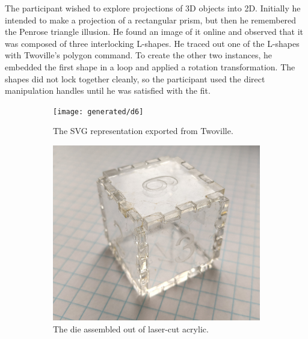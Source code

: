 The participant wished to explore projections of 3D objects into 2D. Initially he intended to make a projection of a rectangular prism, but then he remembered the Penrose triangle illusion. He found an image of it online and observed that it was composed of three interlocking L-shapes. He traced out one of the L-shapes with Twoville's polygon command. To create the other two instances, he embedded the first shape in a loop and applied a rotation transformation. The shapes did not lock together cleanly, so the participant used the direct manipulation handles until he was satisfied with the fit.

\begin{figure}
\begin{minipage}{0.68\linewidth}
\begin{subfigure}{\linewidth}
\begin{minipage}{\linewidth}
\texttt{[image: generated/d6]}
\end{minipage}%
\caption{The SVG representation exported from Twoville.}
\label{figure:crabfish}
\end{subfigure}%
\vspace{0.5em}
\begin{subfigure}{\linewidth}
\center
\includegraphics[width=\linewidth]{pixels/d6-acrylic}
\caption{The die assembled out of laser-cut acrylic.}
\label{figure:d6_acrylic}
\end{subfigure}
\end{minipage}
\hfill
\begin{subfigure}{0.3\linewidth}

\end{subfigure}
\end{figure}
